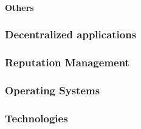 \paragraph{Others}

\subsubsection{Decentralized applications}

\subsubsection{Reputation Management}

\subsubsection{Operating Systems}

\subsubsection{Technologies}

